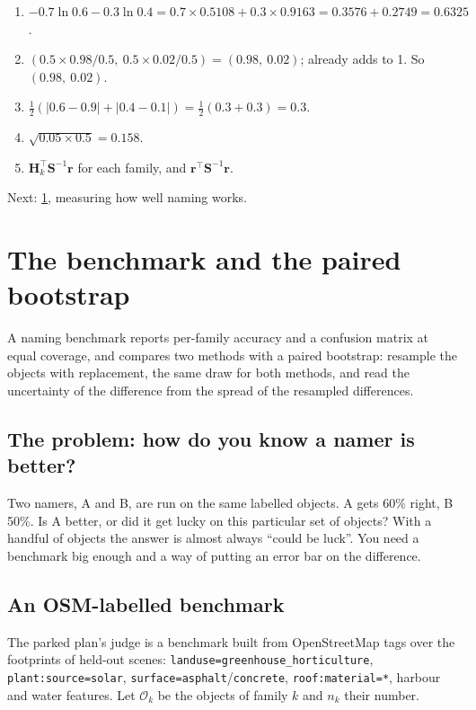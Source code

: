 \documentclass[11pt,a4paper,oneside,openany]{book}
\newcommand{\B}[1]{{\symbf{#1}}}
\newcommand{\B}[1]{{\bm{#1}}}
\newcommand{\T}{^{\top}}
\newcommand{\vr}{\B{r}}
\newcommand{\mS}{\B{S}}
\newcommand{\mH}{\B{H}}
\newcommand{\nextchapter}[1]{\par\medskip\noindent\hfill\textsf{\small Next: #1}\par}
\begin{document}
\begin{answers}
\begin{enumerate}
\item $-0.7\ln0.6-0.3\ln0.4=0.7\times0.5108+0.3\times0.9163=0.3576+0.2749=0.6325$.
\item $(0.5\times0.98/0.5,\ 0.5\times0.02/0.5)=(0.98,\ 0.02)$; already adds to 1. So $(0.98,\ 0.02)$.
\item $\frac12(|0.6-0.9|+|0.4-0.1|)=\frac12(0.3+0.3)=0.3$.
\item $\sqrt{0.05\times0.5}=0.158$.
\item $\mH_k\T\mS^{-1}\vr$ for each family, and $\vr\T\mS^{-1}\vr$.
\end{enumerate}
\end{answers}

\nextchapter{\cref{ch:bench}, measuring how well naming works.}
\chapter{The benchmark and the paired bootstrap}
\label{ch:bench}

\begin{onething}
A naming benchmark reports per-family accuracy and a confusion matrix at equal coverage, and compares two methods with a paired bootstrap: resample the objects with
replacement, the same draw for both methods, and read the uncertainty of the difference from the spread of the resampled differences.
\end{onething}

\section{The problem: how do you know a namer is better?}

Two namers, A and B, are run on the same labelled objects. A gets 60\% right, B 50\%. Is A better, or did it get lucky on this particular set of objects? With a
handful of objects the answer is almost always ``could be luck''. You need a benchmark big enough and a way of putting an error bar on the difference.

\section{An OSM-labelled benchmark}

The parked plan's judge is a benchmark built from OpenStreetMap tags over the footprints of held-out scenes: \texttt{landuse=greenhouse\_horticulture},
\texttt{plant:source=solar}, \texttt{surface=asphalt}/\texttt{concrete}, \texttt{roof:material=*}, harbour and water features. Let $\mathcal O_k$ be the objects of family $k$
and $n_k$ their number.
\end{document}
